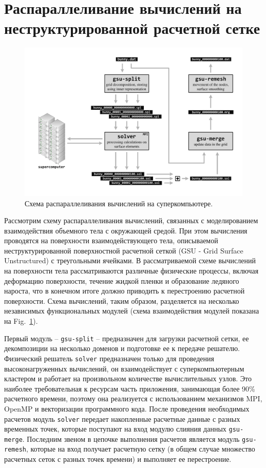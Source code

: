 \documentclass[
11pt,%
tightenlines,%
twoside,%
onecolumn,%
nofloats,%
nobibnotes,%
nofootinbib,%
superscriptaddress,%
noshowpacs,%
centertags]%
{revtex4}
\begin{document}
\section{Распараллеливание вычислений на неструктурированной расчетной сетке}

\begin{figure}[h]
\includegraphics[width=1.0\textwidth]{pics/02-scheme.pdf}
\caption{Схема распараллеливания вычислений на суперкомпьютере.}\label{fig:02-scheme}
\end{figure}

Рассмотрим схему распараллеливания вычислений, связанных с моделированием взаимодействия объемного тела с окружающей средой.
При этом вычисления проводятся на поверхности взаимодействующего тела, описываемой неструктурированной поверхностной расчетной сеткой (GSU - Grid Surface Unstructured) с треугольными ячейками.
В рассматриваемой схеме вычислений на поверхности тела рассматриваются различные физические процессы, включая деформацию поверхности, течение жидкой пленки и образование ледяного нароста, что в конечном итоге должно приводить к перестроению расчетной поверхности.
Схема вычислений, таким образом, разделяется на несколько независимых функциональных модулей (схема взаимодействия модулей показана на Fig.~\ref{fig:02-scheme}).

Первый модуль -- \texttt{gsu-split} -- предназначен для загрузки расчетной сетки, ее декомпозиции на несколько доменов и подготовке ее к передаче решателю.
Физический решатель \texttt{solver} предназначен только для проведения высоконагруженных вычислений, он взаимодействует с суперкомпьютерным кластером и работает на произвольном количестве вычислительных узлов.
Это наиболее требовательная к ресурсам часть приложения, занимающая более 90\% расчетного времени, поэтому она реализуется с использованием механизмов MPI, OpenMP и векторизации программного кода.
После проведения необходимых расчетов модуль \texttt{solver} передает накопленные расчетные данные с разных временных точек, которые поступают на вход модулю слияния данных \texttt{gsu-merge}.
Последним звеном в цепочке выполнения расчетов является модуль \texttt{gsu-remesh}, которые на вход получает расчетную сетку (в общем случае множество расчетных сеток с разных точек времени) и выполняет ее перестроение. 
\end{document}
